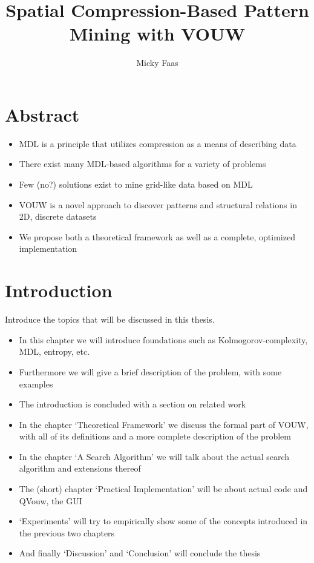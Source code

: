\documentclass[a4paper,notoc,oneside]{tufte-book}
\author{Micky Faas}
\title{Spatial Compression-Based Pattern Mining with VOUW}
\begin{document}
\maketitle

\chapter*{Abstract}
\begin{itemize}
\item MDL is a principle that utilizes compression as a means of describing data
\item There exist many MDL-based algorithms for a variety of problems
\item Few (no?) solutions exist to mine grid-like data based on MDL
\item VOUW is a novel approach to discover patterns and structural relations in 2D, discrete datasets
\item We propose both a theoretical framework as well as a complete, optimized implementation 
\end{itemize}

\setcounter{tocdepth}{3}
\tableofcontents

\chapter{Introduction}

Introduce the topics that will be discussed in this thesis.
\begin{itemize}
\item In this chapter we will introduce foundations such as Kolmogorov-complexity, MDL, entropy, etc.
\item Furthermore we will give a brief description of the problem, with some examples
\item The introduction is concluded with a section on related work
\item In the chapter `Theoretical Framework' we discuss the formal part of VOUW, with all of its definitions and a more complete description of the problem
\item In the chapter `A Search Algorithm' we will talk about the actual search algorithm and extensions thereof 
\item The (short) chapter `Practical Implementation' will be about actual code and QVouw, the GUI
\item `Experiments' will try to empirically show some of the concepts introduced in the previous two chapters
\item And finally `Discussion' and `Conclusion' will conclude the thesis
\end{itemize}
\end{document}
